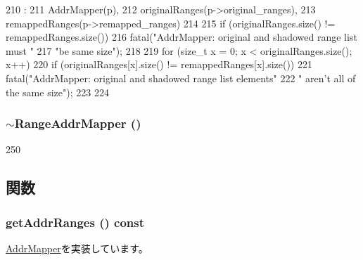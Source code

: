\begin{DoxyCode}
210                                                                :
211     AddrMapper(p),
212     originalRanges(p->original_ranges),
213     remappedRanges(p->remapped_ranges)
214 {
215     if (originalRanges.size() != remappedRanges.size())
216         fatal("AddrMapper: original and shadowed range list must "
217               "be same size\n");
218 
219     for (size_t x = 0; x < originalRanges.size(); x++) {
220         if (originalRanges[x].size() != remappedRanges[x].size())
221             fatal("AddrMapper: original and shadowed range list elements"
222                   " aren't all of the same size\n");
223     }
224 }

\end{DoxyCode}
\hypertarget{classRangeAddrMapper_a5c60978309e5438ca580ba4cb9bd9a9e}{
\subsubsection[{$\sim$RangeAddrMapper}]{\setlength{\rightskip}{0pt plus 5cm}$\sim${\bf RangeAddrMapper} ()}}
\label{classRangeAddrMapper_a5c60978309e5438ca580ba4cb9bd9a9e}



\begin{DoxyCode}
250 { }
\end{DoxyCode}


\subsection{関数}
\hypertarget{classRangeAddrMapper_a36cf113d5e5e091ebddb32306c098fae}{
\subsubsection[{getAddrRanges}]{ getAddrRanges () const}}
\label{classRangeAddrMapper_a36cf113d5e5e091ebddb32306c098fae}


\hyperlink{classAddrMapper_a6e967f8921e80748eb2be35b6b481a7e}{AddrMapper}を実装しています。


